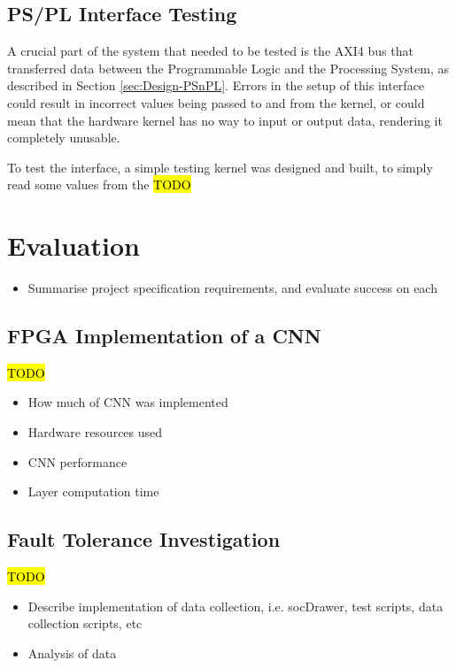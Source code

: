 \documentclass[12pt]{article}
\begin{document}
\subsection{PS/PL Interface Testing}
\label{sec:Test-AXI}

A crucial part of the system that needed to be tested is the AXI4 bus that transferred data between the Programmable Logic and the Processing System, as described in Section \ref{sec:Design-PSnPL}. Errors in the setup of this interface could result in incorrect values being passed to and from the kernel, or could mean that the hardware kernel has no way to input or output data, rendering it completely unusable.

To test the interface, a simple testing kernel was designed and built, to simply read some values from the \hl{TODO}

\newpage

\section{Evaluation}
\label{sec:Eval}

\begin{itemize}
\item Summarise project specification requirements, and evaluate success on each
\end{itemize}

\subsection{FPGA Implementation of a CNN}
\label{sec:Eval-FPGAImplOfCnn}

\hl{TODO}

\begin{itemize}
\item How much of CNN was implemented
\item Hardware resources used
\item CNN performance
\item Layer computation time
\end{itemize}

\subsection{Fault Tolerance Investigation}
\label{sec:Eval-FaultTolInv}

\hl{TODO}

\begin{itemize}
\item Describe implementation of data collection, i.e. socDrawer, test scripts, data collection scripts, etc
\item Analysis of data
\end{itemize}
\end{document}

